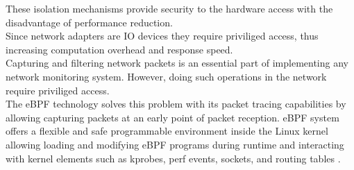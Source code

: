 These isolation mechanisms provide security to the hardware access with the disadvantage of performance reduction.\\
Since network adapters are IO devices they require priviliged access, thus increasing computation overhead
and response speed.\\
Capturing and filtering network packets is an essential part of implementing any network monitoring system.
However, doing such operations in the network require priviliged access.\\

The eBPF technology solves this problem with its packet tracing capabilities by allowing capturing packets
at an early point of packet reception.
eBPF system offers a flexible and safe programmable environment inside the Linux kernel allowing
loading and modifying eBPF programs during runtime and interacting with kernel elements such as kprobes,
perf events, sockets, and routing tables \cite{fournierprocess}.\\
